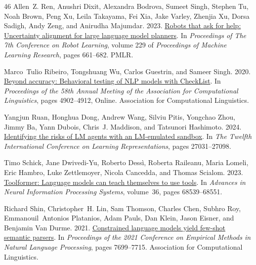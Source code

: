 \documentclass[11pt]{article}
\begin{document}
\begin{thebibliography}{46}
Allen~Z. Ren, Anushri Dixit, Alexandra Bodrova, Sumeet Singh, Stephen Tu, Noah Brown, Peng Xu, Leila Takayama, Fei Xia, Jake Varley, Zhenjia Xu, Dorsa Sadigh, Andy Zeng, and Anirudha Majumdar. 2023.
\newblock \href {https://proceedings.mlr.press/v229/ren23a.html} {Robots that ask for help: Uncertainty alignment for large language model planners}.
\newblock In \emph{Proceedings of The 7th Conference on Robot Learning}, volume 229 of \emph{Proceedings of Machine Learning Research}, pages 661--682. PMLR.

Marco~Tulio Ribeiro, Tongshuang Wu, Carlos Guestrin, and Sameer Singh. 2020.
\newblock \href {https://doi.org/10.18653/v1/2020.acl-main.442} {Beyond accuracy: Behavioral testing of {NLP} models with {C}heck{L}ist}.
\newblock In \emph{Proceedings of the 58th Annual Meeting of the Association for Computational Linguistics}, pages 4902--4912, Online. Association for Computational Linguistics.

Yangjun Ruan, Honghua Dong, Andrew Wang, Silviu Pitis, Yongchao Zhou, Jimmy Ba, Yann Dubois, Chris~J. Maddison, and Tatsunori Hashimoto. 2024.
\newblock \href {https://proceedings.iclr.cc/paper_files/paper/2024/hash/7274ed909a312d4d869cc328ad1c5f04-Abstract-Conference.html} {Identifying the risks of {LM} agents with an {LM}-emulated sandbox}.
\newblock In \emph{The Twelfth International Conference on Learning Representations}, pages 27031--27098.

Timo Schick, Jane Dwivedi-Yu, Roberto Dess{\`i}, Roberta Raileanu, Maria Lomeli, Eric Hambro, Luke Zettlemoyer, Nicola Cancedda, and Thomas Scialom. 2023.
\newblock \href {https://doi.org/10.52202/075280-2997} {{Toolformer}: Language models can teach themselves to use tools}.
\newblock In \emph{Advances in Neural Information Processing Systems}, volume~36, pages 68539--68551.

Richard Shin, Christopher~H. Lin, Sam Thomson, Charles Chen, Subhro Roy, Emmanouil~Antonios Platanios, Adam Pauls, Dan Klein, Jason Eisner, and Benjamin {Van Durme}. 2021.
\newblock \href {https://doi.org/10.18653/v1/2021.emnlp-main.608} {Constrained language models yield few-shot semantic parsers}.
\newblock In \emph{Proceedings of the 2021 Conference on Empirical Methods in Natural Language Processing}, pages 7699--7715. Association for Computational Linguistics.


\end{thebibliography}
\end{document}
